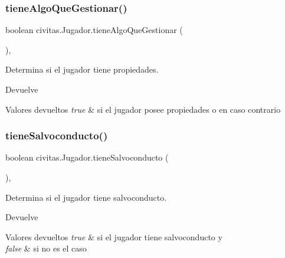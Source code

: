 \subsubsection{\texorpdfstring{tiene\+Algo\+Que\+Gestionar()}{tieneAlgoQueGestionar()}}
{\footnotesize\ttfamily boolean civitas.\+Jugador.\+tiene\+Algo\+Que\+Gestionar (\begin{DoxyParamCaption}{ }\end{DoxyParamCaption})\hspace{0.3cm}{\ttfamily [inline]}, {\ttfamily [package]}}

Determina si el jugador tiene propiedades. \begin{DoxyReturn}{Devuelve}

\end{DoxyReturn}

\begin{DoxyRetVals}{Valores devueltos}
{\em true} & si el jugador posee propiedades o  en caso contrario \\
\hline
\end{DoxyRetVals}
\mbox{\label{classcivitas_1_1Jugador_a378e9a4405d9c44defeddd7488f5a9f9}} 
\subsubsection{\texorpdfstring{tiene\+Salvoconducto()}{tieneSalvoconducto()}}
{\footnotesize\ttfamily boolean civitas.\+Jugador.\+tiene\+Salvoconducto (\begin{DoxyParamCaption}{ }\end{DoxyParamCaption})\hspace{0.3cm}{\ttfamily [inline]}, {\ttfamily [package]}}

Determina si el jugador tiene salvoconducto. \begin{DoxyReturn}{Devuelve}

\end{DoxyReturn}

\begin{DoxyRetVals}{Valores devueltos}
{\em true} & si el jugador tiene salvoconducto y \\
\hline
{\em false} & si no es el caso \\
\hline
\end{DoxyRetVals}
\mbox{\label{classcivitas_1_1Jugador_a102b4070dfc271c865fcd6ebe92d9c06}} 
